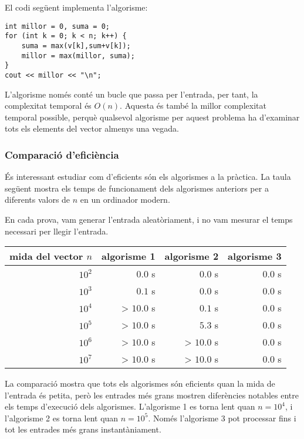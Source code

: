 El codi següent implementa l'algorisme:
\begin{lstlisting}
int millor = 0, suma = 0;
for (int k = 0; k < n; k++) {
    suma = max(v[k],sum+v[k]);
    millor = max(millor, suma);
}
cout << millor << "\n";
\end{lstlisting}

L'algorisme només conté un bucle
que passa per l'entrada,
per tant, la complexitat temporal és $O(n)$.
Aquesta és també la millor complexitat temporal possible,
perquè qualsevol algorisme per aquest problema
ha d'examinar tots els elements del vector almenys una vegada.

\subsubsection{Comparació d'eficiència}

És interessant estudiar com d'eficients són
els algorismes a la pràctica.
La taula següent mostra els temps de funcionament
dels algorismes anteriors per a diferents
valors de $n$ en un ordinador modern.

En cada prova, vam generar l'entrada aleatòriament, i
no vam mesurar el temps necessari per llegir l'entrada.

\begin{centre}
\begin{tabular}{rrrr}
mida del vector $n$ & algorisme 1 & algorisme 2 & algorisme 3 \\
\hline
$10^2$ & $0.0$ s & $0.0$ s & $0.0$ s \\
$10^3$ & $0.1$ s & $0.0$ s & $0.0$ s \\
$10^4$ & > $10.0$ s & $0.1$ s & $0.0$ s \\
$10^5$ & > $10.0$ s & $5.3$ s & $0.0$ s \\
$10^6$ & > $10.0$ s & > $10.0$ s & $0.0$ s \\
$10^7$ & > $10.0$ s & > $10.0$ s & $0.0$ s \\
\end{tabular}
\end{centre}

La comparació mostra que tots els algorismes
són eficients quan la mida de l'entrada és petita,
però les entrades més grans mostren diferències
notables entre els temps d'execució dels algorismes.
L'algorisme 1 es torna lent
quan $n=10^4$, i l'algorisme 2
es torna lent quan $n=10^5$.
Només l'algorisme 3 pot processar
fins i tot les entrades més grans instantàniament.
